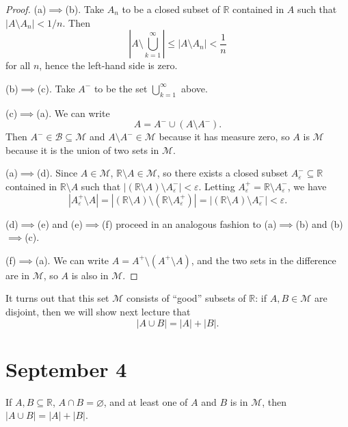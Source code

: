 \documentclass[11pt]{scrartcl}
\providecommand{\eps}{\varepsilon}
\providecommand{\RR}{\mathbb R}
\providecommand{\abs}[1]{\left\lvert #1\right\rvert}
\begin{document}
\begin{proof}
    (a)$\implies$(b). Take $A_n$ to be a closed subset of $\RR$ contained in $A$
    such that $\abs{A\setminus A_n} <1/n$. Then
    \begin{equation*}
	\abs{A\setminus\bigcup_{k=1}^\infty} \le \abs{A\setminus A_n}<\frac 1n
    \end{equation*}
    for all $n$, hence the left-hand side is zero.

    (b)$\implies$(c). Take $A^-$ to be the set $\bigcup_{k=1}^\infty$ above.
    
    (c)$\implies$(a). We can write
    \begin{equation*}
        A = A^-\cup(A\setminus A^-).
    \end{equation*}
    Then $A^-\in\mathcal B\subseteq\mathcal M$ and $A\setminus A^-\in\mathcal M$
    because it has measure zero, so $A$ is $\mathcal M$
    because it is the union of two sets in $\mathcal M$.

    (a)$\implies$(d). Since $A\in\mathcal M$, $\RR\setminus A\in\mathcal M$,
    so there exists a closed subset $A_\eps^-\subseteq\RR$
    contained in $\RR\setminus A$ such that
    $\abs{(\RR\setminus A)\setminus A_\eps^-} < \eps$.
    Letting $A_\eps^+ = \RR\setminus A_\eps^-$, we have
    \begin{equation*}
	\abs{A_\eps^+\setminus A}
	= \abs{(\RR\setminus A)\setminus(\RR\setminus A_\eps^+)}
	= \abs{(\RR\setminus A)\setminus A_\eps^-} < \eps.
    \end{equation*}

    (d)$\implies$(e) and (e)$\implies$(f) proceed
    in an analogous fashion to (a)$\implies$(b) and (b)$\implies$(c).

    (f)$\implies$(a). We can write $A = A^+\setminus(A^+\setminus A)$,
    and the two sets in the difference are in $\mathcal M$,
    so $A$ is also in $\mathcal M$.
\end{proof}

It turns out that this set $\mathcal M$ consists of ``good'' subsets of $\RR$:
if $A,B\in\mathcal M$ are disjoint, then we will show next lecture that
\begin{equation*}
    \abs{A\cup B} = \abs A + \abs B.
\end{equation*}

\section{September 4}\label{sec:sep4}
\begin{prop}
    \label{prop:om-lebesgue-addend}
    If $A,B\subseteq\RR$, $A\cap B = \varnothing$, and
    at least one of $A$ and $B$ is in $\mathcal M$, then
    $\abs{A\cup B} = \abs A + \abs B$.
\end{prop}
\end{document}
